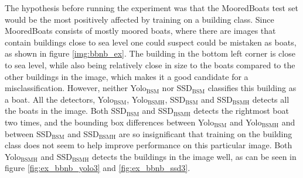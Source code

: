 The hypothesis before running the experiment was that the MooredBoats test set would be the most positively affected by training on a building class. Since MooredBoats consists of mostly moored boats, where there are images that contain buildings close to sea level one could suspect could be mistaken as boats, as shown in figure \ref{img:bbnb_ex}. The building in the bottom left corner is close to sea level, while also being relatively close in size to the boats compared to the other buildings in the image, which makes it a good candidate for a misclassification. However, neither Yolo$_{\text{BSM}}$ nor SSD$_{\text{BSM}}$ classifies this building as a boat. All the detectors, Yolo$_{\text{BSM}}$, Yolo$_{\text{BSMH}}$, SSD$_{\text{BSM}}$ and SSD$_{\text{BSMH}}$ detects all the boats in the image. Both SSD$_{\text{BSM}}$ and SSD$_{\text{BSMH}}$ detects the rightmost boat two times, and the bounding box differences between Yolo$_{\text{BSM}}$ and Yolo$_{\text{BSMH}}$ and between SSD$_{\text{BSM}}$ and SSD$_{\text{BSMH}}$ are so insignificant that training on the building class does not seem to help improve performance on this particular image. Both Yolo$_{\text{BSMH}}$ and SSD$_{\text{BSMH}}$ detects the buildings in the image well, as can be seen in figure \ref{fig:ex_bbnb_yolo3} and \ref{fig:ex_bbnb_ssd3}.


